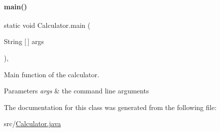 \paragraph{\texorpdfstring{main()}{main()}}
{\footnotesize\ttfamily static void Calculator.\+main (\begin{DoxyParamCaption}\item[{String \mbox{[}$\,$\mbox{]}}]{args }\end{DoxyParamCaption})\hspace{0.3cm}{\ttfamily [inline]}, {\ttfamily [static]}}



Main function of the calculator. 


\begin{DoxyParams}{Parameters}
{\em args} & the command line arguments \\
\hline
\end{DoxyParams}


The documentation for this class was generated from the following file\+:\begin{DoxyCompactItemize}
\item 
src/\hyperlink{Calculator_8java}{Calculator.\+java}\end{DoxyCompactItemize}
